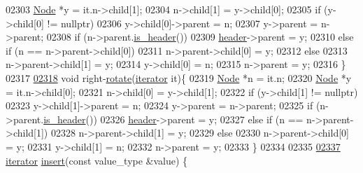 \begin{DoxyCode}
02303                 \hyperlink{structaed2_1_1iterator_1_1Node}{Node} *y = it.n->child[1];
02304                 n->child[1] = y->child[0];
02305                 \textcolor{keywordflow}{if} (y->child[0] != \textcolor{keyword}{nullptr})
02306                     y->child[0]->parent = n;
02307                 y->parent = n->parent;
02308                 \textcolor{keywordflow}{if} (n->parent.\hyperlink{structaed2_1_1iterator_1_1Node_a53c20388ebe2aac8a27c9df4e1fd4775_a53c20388ebe2aac8a27c9df4e1fd4775}{is_header}())
02309                     \hyperlink{classaed2_1_1iterator_a19db18e2e77583eb1fa819e854ff9c71_a19db18e2e77583eb1fa819e854ff9c71}{header}->parent = y;
02310                 \textcolor{keywordflow}{else} if (n == n->parent->child[0])
02311                     n->parent->child[0] = y;
02312                 \textcolor{keywordflow}{else}
02313                     n->parent->child[1] = y;
02314                 y->child[0] = n;
02315                 n->parent = y;
02316             \}
02317 
\hypertarget{map2_8h_source_l02318}{}\hyperlink{classaed2_1_1iterator_a191eae4f3f076914ff1560a2fa833b70_a191eae4f3f076914ff1560a2fa833b70}{02318}             \textcolor{keywordtype}{void} right-\hyperlink{classaed2_1_1iterator_a191eae4f3f076914ff1560a2fa833b70_a191eae4f3f076914ff1560a2fa833b70}{rotate}(\hyperlink{classaed2_1_1iterator_1_1iterator}{iterator} it)\{
02319                 \hyperlink{structaed2_1_1iterator_1_1Node}{Node} *n = it.n;
02320                 \hyperlink{structaed2_1_1iterator_1_1Node}{Node} *y = it.n->child[0];
02321                 n->child[0] = y->child[1];
02322                 \textcolor{keywordflow}{if} (y->child[1] != \textcolor{keyword}{nullptr})
02323                     y->child[1]->parent = n;
02324                 y->parent = n->parent;
02325                 \textcolor{keywordflow}{if} (n->parent.\hyperlink{structaed2_1_1iterator_1_1Node_a53c20388ebe2aac8a27c9df4e1fd4775_a53c20388ebe2aac8a27c9df4e1fd4775}{is_header}())
02326                     \hyperlink{classaed2_1_1iterator_a19db18e2e77583eb1fa819e854ff9c71_a19db18e2e77583eb1fa819e854ff9c71}{header}->parent = y;
02327                 \textcolor{keywordflow}{else} if (n == n->parent->child[1])
02328                     n->parent->child[1] = y;
02329                 \textcolor{keywordflow}{else}
02330                     n->parent->child[0] = y;
02331                 y->child[1] = n;
02332                 n->parent = y;
02333             \}
02334 
02335 
\hypertarget{map2_8h_source_l02337}{}\hyperlink{classaed2_1_1iterator_aa1870e8bfa4f45c82fa1ee076846922b_aa1870e8bfa4f45c82fa1ee076846922b}{02337}             \hyperlink{classaed2_1_1iterator_1_1iterator}{iterator} \hyperlink{classaed2_1_1iterator_aa1870e8bfa4f45c82fa1ee076846922b_aa1870e8bfa4f45c82fa1ee076846922b}{insert}(\textcolor{keyword}{const} value\_type &value) \{

\end{DoxyCode}
